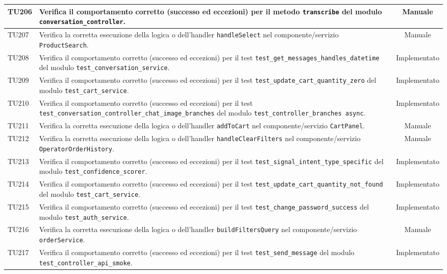 \documentclass[a4paper,11pt,oneside]{scrartcl}
\begin{document}
\begin{longtable}{|p{1.9cm}|p{11.6cm}|c|}
    TU206 & Verifica il comportamento corretto (successo ed eccezioni) per il metodo \texttt{transcribe} del modulo \texttt{conversation\_controller}. & Manuale \\ \hline
    TU207 & Verifica la corretta esecuzione della logica o dell'handler \texttt{handleSelect} nel componente/servizio \texttt{ProductSearch}. & Manuale \\ \hline
    TU208 & Verifica il comportamento corretto (successo ed eccezioni) per il test \texttt{test\_get\_messages\_handles\_datetime} del modulo \texttt{test\_conversation\_service}. & Implementato \\ \hline
    TU209 & Verifica il comportamento corretto (successo ed eccezioni) per il test \texttt{test\_update\_cart\_quantity\_zero} del modulo \texttt{test\_cart\_service}. & Implementato \\ \hline
    TU210 & Verifica il comportamento corretto (successo ed eccezioni) per il test \texttt{test\_conversation\_controller\_chat\_image\_branches} del modulo \texttt{test\_controller\_branches async}. & Implementato \\ \hline
    TU211 & Verifica la corretta esecuzione della logica o dell'handler \texttt{addToCart} nel componente/servizio \texttt{CartPanel}. & Manuale \\ \hline
    TU212 & Verifica la corretta esecuzione della logica o dell'handler \texttt{handleClearFilters} nel componente/servizio \texttt{OperatorOrderHistory}. & Manuale \\ \hline
    TU213 & Verifica il comportamento corretto (successo ed eccezioni) per il test \texttt{test\_signal\_intent\_type\_specific} del modulo \texttt{test\_confidence\_scorer}. & Implementato \\ \hline
    TU214 & Verifica il comportamento corretto (successo ed eccezioni) per il test \texttt{test\_update\_cart\_quantity\_not\_found} del modulo \texttt{test\_cart\_service}. & Implementato \\ \hline
    TU215 & Verifica il comportamento corretto (successo ed eccezioni) per il test \texttt{test\_change\_password\_success} del modulo \texttt{test\_auth\_service}. & Implementato \\ \hline
    TU216 & Verifica la corretta esecuzione della logica o dell'handler \texttt{buildFiltersQuery} nel componente/servizio \texttt{orderService}. & Manuale \\ \hline
    TU217 & Verifica il comportamento corretto (successo ed eccezioni) per il test \texttt{test\_send\_message} del modulo \texttt{test\_controller\_api\_smoke}. & Implementato \\ \hline

\end{longtable}
\end{document}
